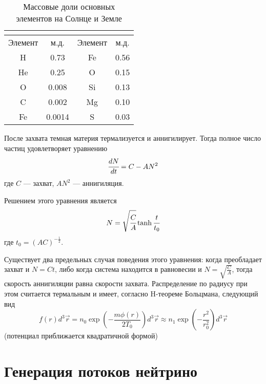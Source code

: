 \begin{table}[h!]
	\centering
	\begin{tabular}{|c|c||c|c|}
		\hline
		\multicolumn{2}{|c||}{\text{Солнце}} & \multicolumn{2}{c|}{\text{Земля}}\\
		\hline
		Элемент & м.д. & Элемент & м.д.\\ 
		\hline
		H &	0.73 & Fe & 0.56\\ 
		\hline
		He & 0.25 & O & 0.15\\
		\hline
		O &	0.008 & Si & 0.13\\
		\hline
		C &	0.002 & Mg & 0.10\\
		\hline
		Fe & 0.0014 & S & 0.03\\
		\hline
	\end{tabular}
	\label{tab:mass_fractions}
	\caption{Массовые доли основных элементов на Солнце и Земле}
\end{table}

После захвата темная материя термализуется и аннигилирует. Тогда полное число частиц удовлетворяет уравнению
\begin{equation}
	\label{eq:evolve_big}
	\cfrac{d N}{d t} = C - A N^2
\end{equation}
где $C$ --- захват, $AN^2$ --- аннигиляция.

Решением этого уравнения является
\begin{equation}
	N = \sqrt{\cfrac{C}{A}}\tanh{\cfrac{t}{t_0}}
\end{equation}
где $t_{0} = (AC)^{-\frac{1}{2}}$.

Существует два предельных случая поведения этого уравнения: когда преобладает захват и $N = Ct$, либо когда система находится в равновесии и $N = \sqrt{\frac{C}{A}}$, тогда скорость аннигиляции равна скорости захвата.
Распределение по радиусу при этом считается термальным и имеет, согласно H-теореме Больцмана, следующий вид
\begin{equation}
	\label{eq:therm_dens}
	f(r) d^3\vec{r} = n_0\exp(-\frac{m\phi(r)}{2T_0})d^3\vec{r} \approx
	 n_1\exp(-\frac{r^2}{r_0^2})d^3\vec{r}
\end{equation}
(потенциал приближается квадратичной формой)



\section{Генерация потоков нейтрино}

